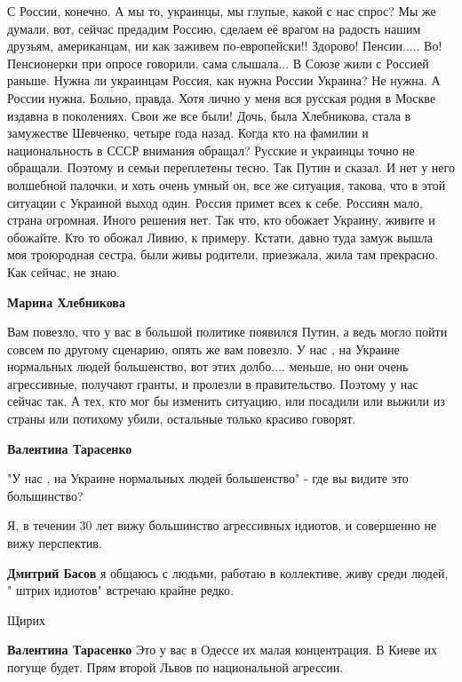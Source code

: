 \begin{itemize}
С России, конечно. А мы то, украинцы, мы глупые, какой с нас спрос? Мы же
думали, вот, сейчас предадим Россию, сделаем её врагом на радость нашим
друзьям, американцам, ии как заживем по-европейски!! Здорово! Пенсии..... Во!
Пенсионерки при опросе говорили, сама слышала... В Союзе жили с Россией раньше.
Нужна ли украинцам Россия, как нужна России Украина? Не нужна. А России нужна.
Больно, правда. Хотя лично у меня вся русская родня в Москве издавна в
поколениях. Свои же все были! Дочь, была Хлебникова, стала в замужестве
Шевченко, четыре года назад. Когда кто на фамилии и национальность в СССР
внимания обращал? Русские и украинцы точно не обращали. Поэтому и семьи
переплетены тесно. Так Путин и сказал. И нет у него волшебной палочки, и хоть
очень умный он, все же ситуация, такова, что в этой ситуации с Украиной выход
один. Россия примет всех к себе. Россиян мало, страна огромная. Иного решения
нет. Так что, кто обожает Украину, живите и обожайте. Кто то обожал Ливию, к
примеру. Кстати, давно туда замуж вышла моя троюродная сестра, были живы
родители, приезжала, жила там прекрасно. Как сейчас, не знаю.

\begin{itemize} %
\textbf{Марина Хлебникова} 

Вам повезло, что у вас в большой политике появился Путин, а ведь могло пойти
совсем по другому сценарию, опять же вам повезло. У нас , на Украине нормальных
людей большенство, вот этих долбо.... меньше, но они очень агрессивные,
получают гранты, и пролезли в правительство. Поэтому у нас сейчас так. А тех, кто
мог бы изменить ситуацию, или посадили или выжили из страны или потихому убили,
остальные только красиво говорят.


\textbf{Валентина Тарасенко}

"У нас , на Украине нормальных людей большенство" - где вы видите это
большинство?

Я, в течении 30 лет вижу большинство агрессивных идиотов, и совершенно не вижу
перспектив.


\textbf{Дмитрий Басов} я общаюсь с людьми, работаю в коллективе, живу среди людей, " штрих идиотов" встречаю крайне редко.

Щирих

\textbf{Валентина Тарасенко} Это у вас в Одессе их малая концентрация. В Киеве их погуще будет. Прям второй Львов по национальной агрессии.


\end{itemize}
\end{itemize}
